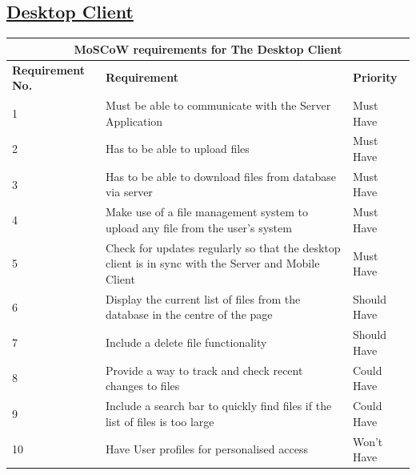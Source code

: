 \documentclass{article}
\begin{document}
\subsection{\underline{Desktop Client}}
\begin{tabular}{|p{3cm}|p{5cm}|p{4cm}|}
\hline
\multicolumn{3}{|c|}{\textbf{MoSCoW requirements for The Desktop Client}} \\
\hline
\textbf{Requirement No.} & \textbf{Requirement} & \textbf{Priority}\\
\hline
1 & Must be able to communicate with the Server Application & Must Have \\
\hline
2 & Has to be able to upload files & Must Have \\
\hline
3 & Has to be able to download files from database via server & Must Have \\
\hline
4 & Make use of a file management system to upload any file from the user's system & Must Have \\
\hline
5 & Check for updates regularly so that the desktop client is in sync with the Server and Mobile Client & Must Have\\
\hline
6 & Display the current list of files from the database in the centre of the page & Should Have \\
\hline
7 & Include a delete file functionality   & Should Have \\
\hline
8 & Provide a way to track and check recent changes to files & Could Have\\
\hline
9 & Include a search bar to quickly find files if the list of files is too large & Could Have \\
\hline
10 & Have User profiles for personalised access & Won't Have \\
\hline
\end{tabular}
\end{document}
